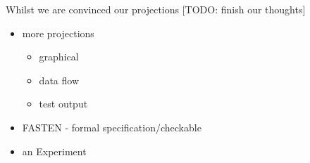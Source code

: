 Whilst we are convinced our projections [TODO: finish our thoughts]



\begin{itemize}
    \item more projections
    \begin{itemize}
        \item graphical
        \item data flow
        \item test output
    \end{itemize}
    \item FASTEN - formal specification/checkable
    \item an Experiment
\end{itemize}